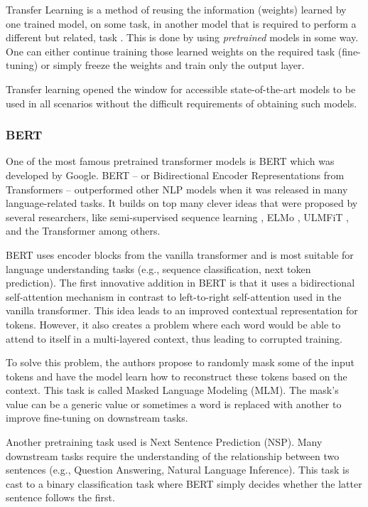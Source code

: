 Transfer Learning is a method of reusing the information (weights) learned by one trained model, on some task, in another model that is required to perform a different but related, task \citep{Goodfellow-et-al-2016}. This is done by using \textit{pretrained} models in some way. One can either continue training those learned weights on the required task (fine-tuning) or simply freeze the weights and train only the output layer.

Transfer learning opened the window for accessible state-of-the-art models to be used in all scenarios without the difficult requirements of obtaining such models.

\subsubsection{BERT}
\label{sec:bert_intro}

One of the most famous pretrained transformer models is BERT which was developed by Google. BERT \citep{devlin2018bert} -- or Bidirectional Encoder Representations from Transformers -- outperformed other NLP models when it was released in many language-related tasks. It builds on top many clever ideas that were proposed by several researchers, like semi-supervised sequence learning \citep{dai2015semi}, ELMo \citep{peters2018deep}, ULMFiT \citep{howard2018universal}, and the Transformer \citep{vaswani2017attention} among others.

BERT uses encoder blocks from the vanilla transformer and is most suitable for language understanding tasks (e.g., sequence classification, next token prediction). The first innovative addition in BERT is that it uses a bidirectional self-attention mechanism in contrast to left-to-right self-attention used in the vanilla transformer. This idea leads to an improved contextual representation for tokens. However, it also creates a problem where each word would be able to attend to itself in a multi-layered context, thus leading to corrupted training.

To solve this problem, the authors propose to randomly mask some of the input tokens and have the model learn how to reconstruct these tokens based on the context. This task is called Masked Language Modeling (MLM). The mask's value can be a generic value or sometimes a word is replaced with another to improve fine-tuning on downstream tasks.

Another pretraining task used is Next Sentence Prediction (NSP). Many downstream tasks require the understanding of the relationship between two sentences (e.g., Question Answering, Natural Language Inference). This task is cast to a binary classification task where BERT simply decides whether the latter sentence follows the first.


